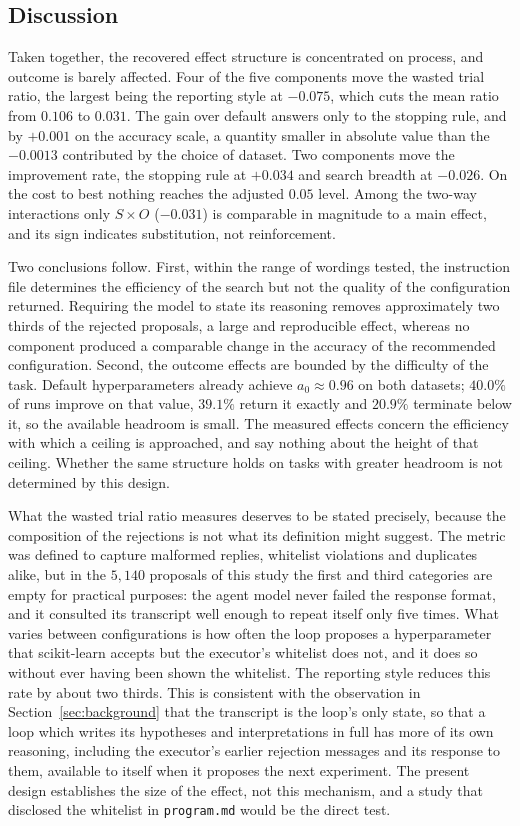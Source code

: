 \documentclass[11pt]{article}
\begin{document}
\subsection{Discussion}
\label{sec:discussion}

Taken together, the recovered effect structure is concentrated on process, and outcome is barely affected. Four of the five components move the wasted trial ratio, the largest being the reporting style at $-0.075$, which cuts the mean ratio from $0.106$ to $0.031$. The gain over default answers only to the stopping rule, and by $+0.001$ on the accuracy scale, a quantity smaller in absolute value than the $-0.0013$ contributed by the choice of dataset. Two components move the improvement rate, the stopping rule at $+0.034$ and search breadth at $-0.026$. On the cost to best nothing reaches the adjusted $0.05$ level. Among the two-way interactions only $S\times O$ ($-0.031$) is comparable in magnitude to a main effect, and its sign indicates substitution, not reinforcement.

Two conclusions follow. First, within the range of wordings tested, the instruction file determines the efficiency of the search but not the quality of the configuration returned. Requiring the model to state its reasoning removes approximately two thirds of the rejected proposals, a large and reproducible effect, whereas no component produced a comparable change in the accuracy of the recommended configuration. Second, the outcome effects are bounded by the difficulty of the task. Default hyperparameters already achieve $a_0 \approx 0.96$ on both datasets; $40.0\%$ of runs improve on that value, $39.1\%$ return it exactly and $20.9\%$ terminate below it, so the available headroom is small. The measured effects concern the efficiency with which a ceiling is approached, and say nothing about the height of that ceiling. Whether the same structure holds on tasks with greater headroom is not determined by this design.

What the wasted trial ratio measures deserves to be stated precisely, because the composition of the rejections is not what its definition might suggest. The metric was defined to capture malformed replies, whitelist violations and duplicates alike, but in the $5{,}140$ proposals of this study the first and third categories are empty for practical purposes: the agent model never failed the response format, and it consulted its transcript well enough to repeat itself only five times. What varies between configurations is how often the loop proposes a hyperparameter that scikit-learn accepts but the executor's whitelist does not, and it does so without ever having been shown the whitelist. The reporting style reduces this rate by about two thirds. This is consistent with the observation in Section~\ref{sec:background} that the transcript is the loop's only state, so that a loop which writes its hypotheses and interpretations in full has more of its own reasoning, including the executor's earlier rejection messages and its response to them, available to itself when it proposes the next experiment. The present design establishes the size of the effect, not this mechanism, and a study that disclosed the whitelist in \texttt{program.md} would be the direct test.
\end{document}
